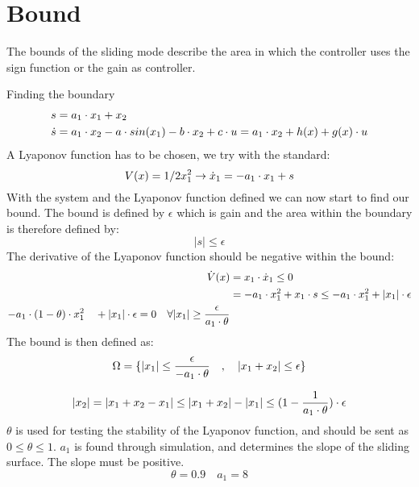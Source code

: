 \section{Bound} %
\label{sec:bound}
The bounds of the sliding mode describe the area in which the controller uses the sign function or the gain as controller.

Finding the boundary
\begin{equation}
\begin{split}
        s &= a_1 \cdot x_1 + x_2 \\
        \dot{s} &= a_1 \cdot x_2 - a \cdot sin(x_1) - b \cdot x_2 + c \cdot u = a_1 \cdot x_2 + h(x) + g(x) \cdot u
\end{split}
\end{equation}
A Lyaponov function has to be chosen, we try with the standard:
\begin{equation}
        V(x) = 1/2 x_1^2 \rightarrow \dot{x}_1 = -a_1 \cdot x_1 + s
\end{equation}
With the system and the Lyaponov function defined we can now start to find our bound. The bound is defined by $\epsilon$ which is gain and the area within the boundary is therefore defined by:
\begin{equation}
        \vert s \vert \leq \epsilon
\end{equation}
The derivative of the Lyaponov function should be negative within the bound:
\begin{equation}
        \begin{split}
                \dot{V}(x) &= x_1 \cdot \dot{x}_1 \leq 0 \\
                &= -a_1 \cdot x_1^2 + x_1 \cdot s \leq -a_1 \cdot x_1^2 + |x_1| \cdot \epsilon \\
                 -a_1 \cdot (1-\theta) \cdot x_1^2 \quad +\vert x_1 \vert \cdot \epsilon = 0 \quad\forall |x_1| \geq \frac{\epsilon}{a_1 \cdot \theta}
        \end{split}
\end{equation}
The bound is then defined as:
\begin{equation}
        \Omega = \{ |x_1| \leq \frac{\epsilon}{-a_1 \cdot \theta} \quad , \quad |x_1 + x_2| \leq \epsilon \}
\end{equation}

\begin{equation}
        |x_2| = |x_1 + x_2 - x_1| \leq |x_1 + x_2| - |x_1| \leq (1 - \frac{1}{a_1 \cdot \theta}) \cdot \epsilon
\end{equation}
$\theta$ is used for testing the stability of the Lyaponov function, and should be sent as $0 \leq \theta \leq 1$. $a_1$ is found through simulation, and determines the slope of the sliding surface. The slope must be positive.
\begin{equation}
        \theta = 0.9 \quad a_1 = 8
\end{equation}


